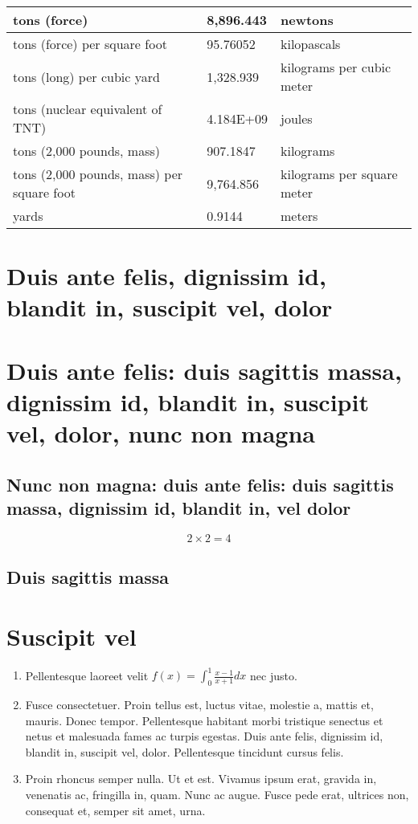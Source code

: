 \documentclass{template/openetcs_article}
\begin{document}
{\begin{longtable}{||l|l|l||}
    \hline
    tons (force) & 8,896.443 & newtons\\
    \hline
    tons (force) per square foot & 95.76052 & kilopascals\\
    \hline
    tons (long) per cubic yard & 1,328.939 & kilograms per cubic meter\\
    \hline
    tons (nuclear equivalent of TNT) & 4.184E+09 & joules\\
    \hline
    tons (2,000 pounds, mass) & 907.1847 & kilograms\\
    \hline
    tons (2,000 pounds, mass) per square foot & 9,764.856 & kilograms per square meter\\
\hline
yards & 0.9144 & meters\\
\hline
\end{longtable}}


\section{Duis ante felis, dignissim id, blandit in, suscipit vel,
  dolor}
\section{Duis ante felis: duis sagittis massa, dignissim id, blandit
  in, suscipit vel, dolor, nunc non magna}
\subsection{Nunc non magna: duis ante felis: duis sagittis massa,
  dignissim id, blandit in, vel dolor}
\lipsum[6]

\begin{equation}
  \label{eq:eq}
  2\times2=4
\end{equation}

\subsection{Duis sagittis massa}

\lipsum[7-9]

\section{Suscipit vel}

\lipsum[23]

\begin{enumerate}
\item Pellentesque laoreet velit $f(x)= \int_0^1 \frac{x-1}{x+1}dx$ nec justo.
\item Fusce consectetuer. Proin tellus est, luctus vitae,
  molestie a, mattis et, mauris. Donec tempor. Pellentesque habitant
  morbi tristique senectus et netus et malesuada fames ac turpis
  egestas. Duis ante felis, dignissim id, blandit in, suscipit vel,
  dolor. Pellentesque tincidunt cursus felis.
\item Proin rhoncus semper
  nulla. Ut et est. Vivamus ipsum erat, gravida in, venenatis ac,
  fringilla in, quam. Nunc ac augue. Fusce pede erat, ultrices non,
  consequat et, semper sit amet, urna.
\end{enumerate}
\end{document}
